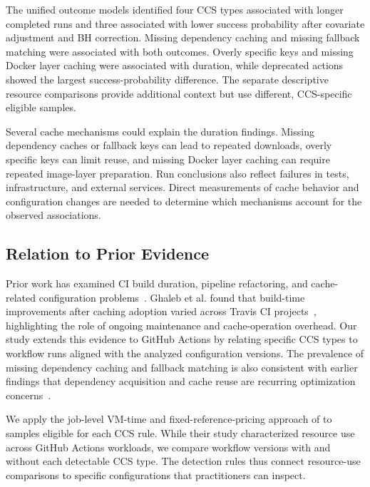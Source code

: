 \documentclass[smallextended]{svjour3}
\begin{document}
The unified outcome models identified four CCS types associated with longer completed runs and three associated with lower success probability after covariate adjustment and BH correction. Missing dependency caching and missing fallback matching were associated with both outcomes. Overly specific keys and missing Docker layer caching were associated with duration, while deprecated actions showed the largest success-probability difference. The separate descriptive resource comparisons provide additional context but use different, CCS-specific eligible samples.

Several cache mechanisms could explain the duration findings. Missing dependency caches or fallback keys can lead to repeated downloads, overly specific keys can limit reuse, and missing Docker layer caching can require repeated image-layer preparation. Run conclusions also reflect failures in tests, infrastructure, and external services. Direct measurements of cache behavior and configuration changes are needed to determine which mechanisms account for the observed associations.

\subsection{Relation to Prior Evidence}

Prior work has examined CI build duration, pipeline refactoring, and cache-related configuration problems~\citep{ghaleb2019empirical,ghaleb2022studying,zampetti2021ci,urdih2026cache}. Ghaleb et al. found that build-time improvements after caching adoption varied across Travis CI projects~\citep{ghaleb2026cachingreality}, highlighting the role of ongoing maintenance and cache-operation overhead. Our study extends this evidence to GitHub Actions by relating specific CCS types to workflow runs aligned with the analyzed configuration versions. The prevalence of missing dependency caching and fallback matching is also consistent with earlier findings that dependency acquisition and cache reuse are recurring optimization concerns~\citep{gallaba2022caching,bouzenia2024resource,hasan2026caching}.

We apply the job-level VM-time and fixed-reference-pricing approach of \citet{bouzenia2024resource} to samples eligible for each CCS rule. While their study characterized resource use across GitHub Actions workloads, we compare workflow versions with and without each detectable CCS type. The detection rules thus connect resource-use comparisons to specific configurations that practitioners can inspect.
\end{document}
